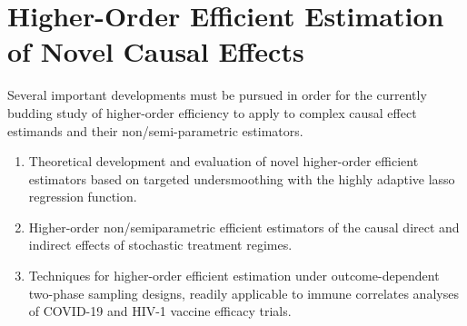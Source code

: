 \section{Higher-Order Efficient Estimation of Novel Causal Effects}

Several important developments must be pursued in order for the currently
budding study of higher-order efficiency to apply to complex causal effect
estimands and their non/semi-parametric estimators.
\begin{enumerate}[label=(\alph*)]
  \itemsep0.2pt
  \item Theoretical development and evaluation of novel higher-order efficient
    estimators based on targeted undersmoothing with the highly adaptive lasso
    regression function.
  \item Higher-order non/semiparametric efficient estimators of the causal
    direct and indirect effects of stochastic treatment regimes.
  \item Techniques for higher-order efficient estimation under outcome-dependent
      two-phase sampling designs, readily applicable to immune correlates
      analyses of COVID-19 and HIV-1 vaccine efficacy trials.
\end{enumerate}

